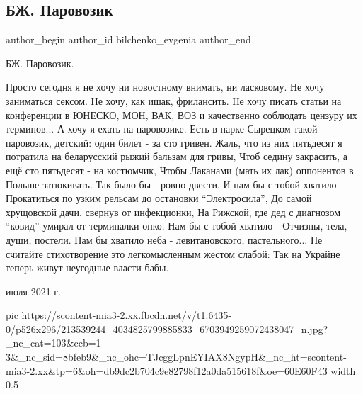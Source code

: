  
 
 
 
 
 
\subsection{БЖ. Паровозик}
\label{sec:04_07_2021.fb.bilchenko_evgenia.1.parovozik}
\ifcmt
 author_begin
   author_id bilchenko_evgenia
 author_end
\fi

\noindent БЖ. Паровозик.

\obeycr\noindent
Просто сегодня я не хочу ни новостному внимать, ни ласковому.
Не хочу заниматься сексом. Не хочу, как ишак, фрилансить.
Не хочу писать статьи на конференции в ЮНЕСКО, МОН, ВАК, ВОЗ и качественно 
соблюдать цензуру их терминов... 
А хочу я ехать на паровозике.
\smallskip
Есть в парке Сырецком такой паровозик, детский: один билет - за сто гривен.
Жаль, что из них пятьдесят я потратила на беларусский рыжий бальзам для гривы,
Чтоб седину закрасить, а ещё сто пятьдесят - на костюмчик,
Чтобы Лаканами (мать их лак) оппонентов в Польше затюкивать.
\smallskip
Так было бы - ровно двести. И нам бы с тобой хватило 
Прокатиться по узким рельсам до остановки \enquote{Электросила},
До самой хрущовской дачи, свернув от инфекционки,
На Рижской, где дед с диагнозом \enquote{ковид} умирал от терминалки онко.
\smallskip
Нам бы с тобой хватило - Отчизны, тела, души, постели.
Нам бы хватило неба - левитановского, пастельного...
Не считайте стихотворение это легкомысленным жестом слабой:
Так на Украйне теперь живут неугодные власти бабы. 
\restorecr

 июля 2021 г.

\ifcmt
  pic https://scontent-mia3-2.xx.fbcdn.net/v/t1.6435-0/p526x296/213539244_4034825799885833_6703949259072438047_n.jpg?_nc_cat=103&ccb=1-3&_nc_sid=8bfeb9&_nc_ohc=TJcggLpnEYIAX8NgypH&_nc_ht=scontent-mia3-2.xx&tp=6&oh=db9dc2b704c9e82798f12a0da515618f&oe=60E60F43
  width 0.5
\fi
